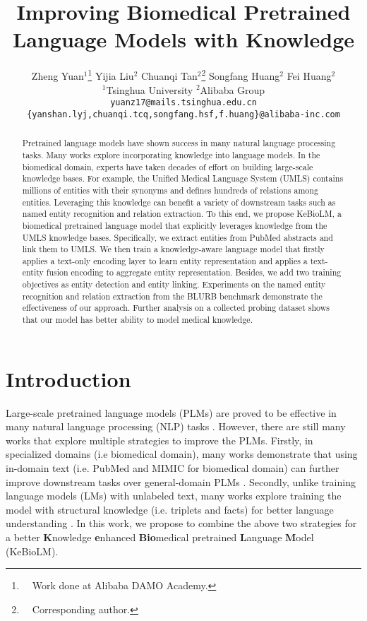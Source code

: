 \documentclass[11pt]{article}
\title{Improving Biomedical Pretrained Language Models with Knowledge}
\author{
Zheng Yuan$^{1}$\thanks{$\quad$Work done at Alibaba DAMO Academy.} \space\space\space
Yijia Liu$^{2}$ \space\space
Chuanqi Tan$^{2}$\thanks{$\quad$Corresponding author.} \space\space\space
Songfang Huang$^{2}$ \space\space
Fei Huang$^{2}$\\
$^{1}$Tsinghua University \space\space\space\space
$^{2}$Alibaba Group\\
\texttt{yuanz17@mails.tsinghua.edu.cn}\\
\texttt{\{yanshan.lyj,chuanqi.tcq,songfang.hsf,f.huang\}@alibaba-inc.com}
}
\begin{document}
\maketitle
\begin{abstract}



Pretrained language models have shown success in many natural language processing tasks.
Many works explore incorporating knowledge into language models.
In the biomedical domain, experts have taken decades of effort on building large-scale knowledge bases.
For example, the Unified Medical Language System (UMLS) contains millions of entities with their synonyms and defines hundreds of relations among entities.
Leveraging this knowledge can benefit a variety of downstream tasks such as named entity recognition and relation extraction.
To this end, we propose KeBioLM, a biomedical pretrained language model that explicitly leverages knowledge from the UMLS knowledge bases.
Specifically, we extract entities from PubMed abstracts and link them to UMLS.
We then train a knowledge-aware language model that firstly applies a text-only encoding layer to learn entity representation and applies a text-entity fusion encoding to aggregate entity representation. Besides, we add two training objectives as entity detection and entity linking.
Experiments on the named entity recognition and relation extraction from the BLURB benchmark demonstrate the effectiveness of our approach. Further analysis on a collected probing dataset shows that our model has better ability to model medical knowledge.

\end{abstract}

\section{Introduction}
Large-scale pretrained language models (PLMs) are proved to be effective in many natural language processing (NLP) tasks \cite{peters-etal-2018-deep,devlin-etal-2019-bert}.
However, there are still many works that explore multiple strategies to improve the PLMs. Firstly, in specialized domains (i.e biomedical domain), many works demonstrate that using in-domain text (i.e. PubMed and MIMIC for biomedical domain) can further improve downstream tasks over general-domain PLMs \cite{lee2020biobert, peng-etal-2019-transfer, gu2020domain, shin-etal-2020-biomegatron, lewis-etal-2020-pretrained, beltagy-etal-2019-scibert, alsentzer-etal-2019-publicly}.
Secondly, unlike training language models (LMs) with unlabeled text, many works explore training the model with structural knowledge (i.e. triplets and facts) for better language understanding \cite{zhang-etal-2019-ernie,peters-etal-2019-knowledge,fevry-etal-2020-entities,wang2019kepler}. In this work, we propose to combine the above two strategies for a better \textbf{K}nowledge \textbf{e}nhanced \textbf{Bio}medical pretrained \textbf{L}anguage \textbf{M}odel (KeBioLM). 
\end{document}
